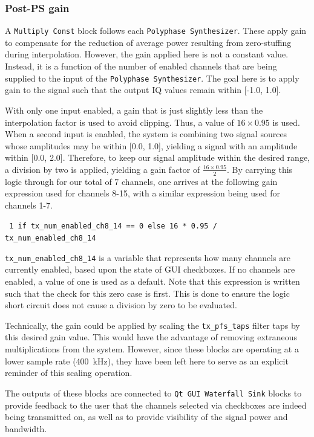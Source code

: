\subsubsection{Post-PS gain}

A \texttt{Multiply Const} block follows each \texttt{Polyphase Synthesizer}.
These apply gain to compensate for the reduction of average power
resulting from zero-stuffing during interpolation.  However, the gain applied
here is not a constant value. Instead, it is a function of the number of
enabled channels that are being supplied to the input of the \texttt{Polyphase
Synthesizer}. The goal here is to apply gain to the signal such that the output IQ
values remain within [-1.0, 1.0].

With only one input enabled, a gain that is just slightly less than
the interpolation factor is used to avoid clipping. Thus, a value of $16 \times
0.95$ is used. When a second input is enabled, the system is combining two signal
sources whose amplitudes may be within [0.0, 1.0], yielding a signal with an
amplitude within [0.0, 2.0].  Therefore, to keep our signal amplitude within
the desired range, a division by two is applied, yielding a gain factor of
$\frac{16 \times 0.95}{2}$. By carrying this logic through for our total of 7
channels, one arrives at the following gain expression used for channels 8-15,
with a similar expression being used for channels 1-7.

\begin{center}
    \footnotesize{ \texttt{
        1 if tx\_num\_enabled\_ch8\_14 == 0 else 16 * 0.95 / tx\_num\_enabled\_ch8\_14
    } }
\end{center}

\texttt{tx\_num\_enabled\_ch8\_14} is a variable that represents how many
channels are currently enabled, based upon the state of GUI checkboxes. If no
channels are enabled, a value of one is used as a default. Note that this
expression is written such that the check for this zero case is first. This is
done to ensure the logic short circuit does not cause a division by zero to be
evaluated.

Technically, the gain could be applied by scaling the \texttt{tx\_pfs\_taps}
filter taps by this desired gain value. This would have the advantage of
removing extraneous multiplications from the system. However, since these
blocks are operating at a lower sample rate (400~kHz), they have been left here
to serve as an explicit reminder of this scaling operation.

The outputs of these blocks are connected to \texttt{Qt GUI Waterfall Sink}
blocks to provide feedback to the user that the channels selected via
checkboxes are indeed being transmitted on, as well as to provide visibility
of the signal power and bandwidth.

